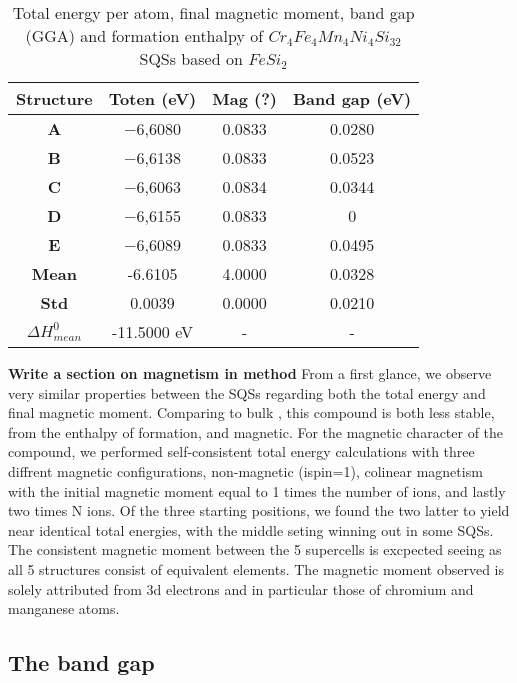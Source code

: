 \begin{table}[H]
\centering
\begin{tabular}{@{}cccc@{}}
\toprule
Structure  & Toten (eV) & Mag (?) & Band gap (eV) \\ \midrule
\textbf{A} & −6,6080                & 0.0833                    & 0.0280        \\
\textbf{B} & −6,6138                & 0.0833                    & 0.0523        \\
\textbf{C} & −6,6063                & 0.0834                    & 0.0344        \\
\textbf{D} & −6,6155                & 0.0833                    & 0             \\
\textbf{E} & −6,6089                & 0.0833                    & 0.0495        \\ \midrule
\textbf{Mean} & -6.6105 & 4.0000 & 0.0328    \\
\textbf{Std} & 0.0039 &  0.0000 &  0.0210 \\
\textbf{$\Delta H_{mean}^0$} & -11.5000 eV & - & - \\ \bottomrule
\end{tabular}
\caption{Total energy per atom, final magnetic moment, band gap (GGA) and formation enthalpy of $Cr_4Fe_4Mn_4Ni_4Si_{32}$ SQSs based on $FeSi_2$}
\label{table:fesi2_summary}
\end{table}  

\textbf{Write a section on magnetism in method}
From a first glance, we observe very similar properties between the SQSs regarding both the total energy and final magnetic moment. Comparing to bulk , this compound is both less stable, from the enthalpy of formation, and magnetic. For the magnetic character of the compound, we performed self-consistent total energy calculations with three diffrent magnetic configurations, non-magnetic (ispin=1), colinear magnetism with the initial magnetic moment equal to 1 times the number of ions, and lastly two times N ions. Of the three starting positions, we found the two latter to yield near identical total energies, with the middle seting winning out in some SQSs. The consistent magnetic moment between the 5 supercells is excpected seeing as all 5 structures consist of equivalent elements. The magnetic moment observed is solely attributed from 3d electrons and in particular those of chromium and manganese atoms. 
 
\subsection{The band gap} 
 
